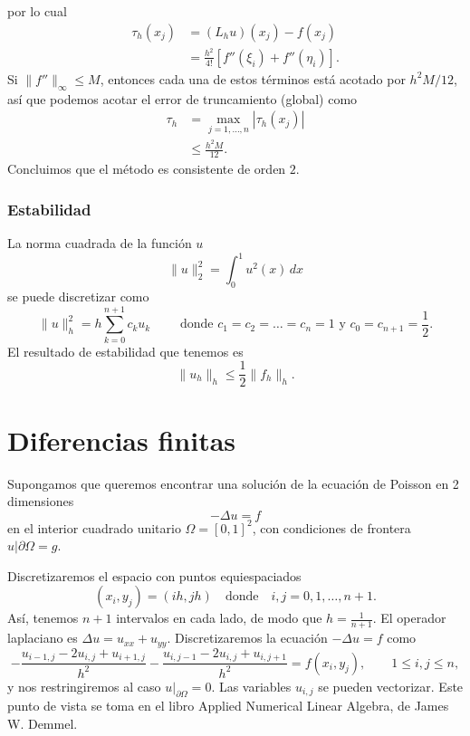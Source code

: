 \documentclass[11pt,letterpaper]{report}
\begin{document}
por lo cual
\begin{align}
  \tau_{h}(x_j)
  &= (L_hu)(x_j) - f(x_j) \\
  &=
    \frac{h^{2}}{4!} [ f''(\xi_i) + f''(\eta_i) ]
.\end{align}
Si $\|f''\|_{\infty}\leq M$, entonces cada una de estos términos está
acotado por $h^{2}M/12$, así que podemos acotar el error de
truncamiento (global) como
\begin{align}
  \tau_{h}
  &= \max_{j=1,\dots,n} |\tau_{h}(x_j)| \\
  &\leq \frac{h^{2}M}{12}
.\end{align}
Concluimos que el método es consistente de orden $2$.

\subsection{Estabilidad}

La norma cuadrada de la función $u$
\begin{equation}
  \|u\|^{2}_2 = \int_{0}^{1}u^{2}(x)\,dx
\end{equation}
se puede discretizar como
\begin{equation}
  \|u\|^{2}_h = h\sum_{k=0}^{n+1}c_ku_k
  \qquad \text{ donde }
  c_1=c_2=\dots=c_n=1 
  \text{ y }
  c_0=c_{n+1}=\frac{1}{2}.
\end{equation}
El resultado de estabilidad que tenemos es
\begin{equation}
  \|u_h\|_h \leq \frac{1}{2} \|f_h\|_h
.\end{equation}


\chapter{Diferencias finitas}

Supongamos que queremos encontrar una solución de la ecuación de
Poisson en 2 dimensiones
\begin{equation}
  -\Delta u = f
\end{equation}
en el interior cuadrado unitario $\Omega=[0,1]^{2}$, con condiciones
de frontera $u|\partial\Omega = g$.

Discretizaremos el espacio con puntos equiespaciados
\begin{equation}
  (x_i,y_j)=(ih,jh) \quad \text{donde} \quad i,j=0,1,\dots,n+1
.\end{equation}
Así, tenemos $n+1$ intervalos en cada lado, de modo que
$h=\frac{1}{n+1}$.
El operador laplaciano es $\Delta u = u_{xx}+u_{yy}$. Discretizaremos
la ecuación $-\Delta u = f$ como
\begin{equation}
  -\frac{u_{i-1,j} - 2u_{i,j} + u_{i+1,j}}{h^{2}}
  -\frac{u_{i,j-1} - 2u_{i,j} + u_{i,j+1}}{h^{2}}
  =
  f(x_i,y_j),
  \qquad
  1\leq i,j\leq n
,\end{equation}
y nos restringiremos al caso $u|_{\partial\Omega}=0$.
Las variables $u_{i,j}$ se pueden vectorizar. Este punto de vista se
toma en el libro Applied Numerical Linear Algebra, de James W.
Demmel.
\end{document}
